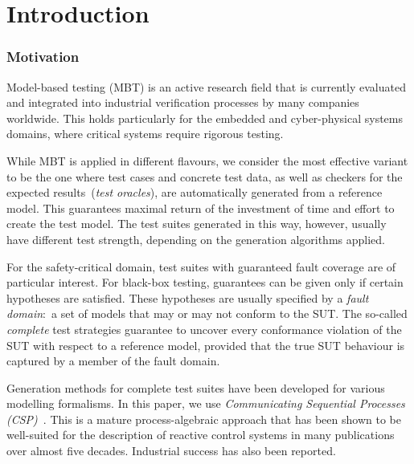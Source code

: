 
\section{Introduction}
\label{sec:intro}


\subsubsection*{Motivation}

Model-based testing (MBT) is an  active research field that is currently
evaluated and integrated into industrial verification processes by many
companies worldwide. This holds particularly for the embedded and
cyber-physical systems domains, where critical systems require rigorous
testing.

While MBT is applied in different flavours, we consider the most effective
variant to be the one where test cases and concrete test data, as well as
checkers for the expected results~(\emph{test oracles}), are automatically
generated from a reference model. This guarantees maximal return of the
investment of time and effort to create the test model. The test suites
generated in this way, however, usually have different test strength,
depending on the generation algorithms applied.

For the safety-critical domain, test suites with guaranteed fault coverage
are of particular interest. For black-box testing, guarantees can be given
only if certain hypotheses are satisfied. These hypotheses are usually
specified by a \emph{fault domain}:~a set of models that may or may not
conform to the SUT. The so-called \emph{complete} test strategies guarantee
to uncover every conformance violation of the SUT with respect to a reference
model, provided that the true SUT behaviour is captured by a member of the
fault domain.

Generation methods for complete test suites have been developed for various
modelling formalisms. In this paper, we use \emph{Communicating Sequential
Processes (CSP)}~\cite{Hoare:1985:CSP:3921,Roscoe2010}. This is a mature
process-algebraic approach that has been shown to be well-suited for the
description of reactive control systems in many publications over almost five
decades. Industrial success has also been reported.

